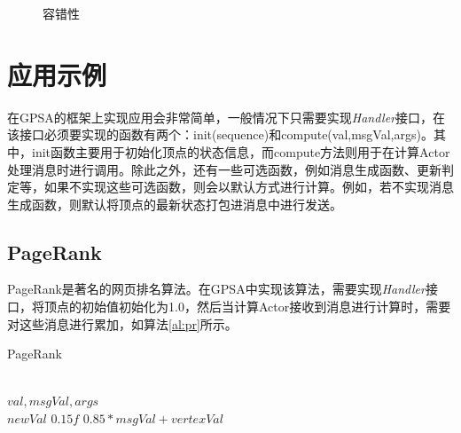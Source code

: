 \begin{figure}[htbp]
  \centering
  \caption{容错性}\label{fig:ft}
\vspace{\baselineskip}
\end{figure}




\section{应用示例}
在GPSA的框架上实现应用会非常简单，一般情况下只需要实现\textit{Handler}接口，在该接口必须要实现的函数有两个：\textnormal{init(sequence)}和\textnormal{compute(val,msgVal,args)}。其中，\textnormal{init}函数主要用于初始化顶点的状态信息，而compute方法则用于在计算Actor处理消息时进行调用。除此之外，还有一些可选函数，例如消息生成函数、更新判定等，如果不实现这些可选函数，则会以默认方式进行计算。例如，若不实现消息生成函数，则默认将顶点的最新状态打包进消息中进行发送。

\subsection{PageRank}
PageRank是著名的网页排名算法。在GPSA中实现该算法，需要实现\textit{Handler}接口，将顶点的初始值初始化为1.0，然后当计算Actor接收到消息进行计算时，需要对这些消息进行累加，如算法\ref{al:pr}所示。
\begin{algorithm}
{
{
\renewcommand\baselinestretch{1.5}\selectfont %

\caption{PageRank}
\label{al:pr}
\begin{algorithmic}[1]
\REQUIRE ~\\
	$val,msgVal,args$
\ENSURE ~\\
	$newVal$
	 \RETURN $ 0.15f$
\ENDIF
\RETURN $0.85*msgVal + vertexVal$

\end{algorithmic}
}
\par}
\end{algorithm}

